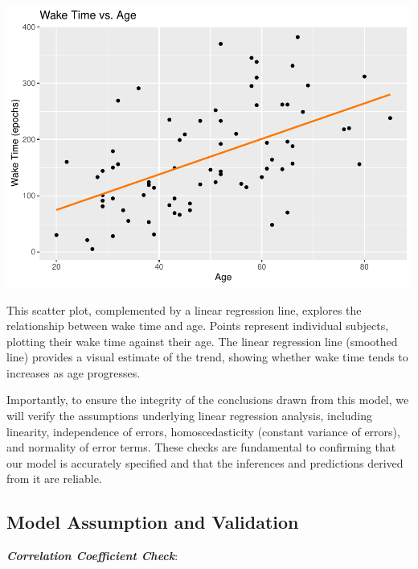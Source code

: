 \documentclass[
]{article}
\newenvironment{Shaded}{\begin{snugshade}}{\end{snugshade}}
\newcommand{\FunctionTok}[1]{\textcolor[rgb]{0.13,0.29,0.53}{\textbf{#1}}}
\newcommand{\NormalTok}[1]{#1}
\newcommand{\SpecialCharTok}[1]{\textcolor[rgb]{0.81,0.36,0.00}{\textbf{#1}}}
\begin{document}
\includegraphics{602_project_files/figure-latex/unnamed-chunk-19-1.pdf}

This scatter plot, complemented by a linear regression line, explores
the relationship between wake time and age. Points represent individual
subjects, plotting their wake time against their age. The linear
regression line (smoothed line) provides a visual estimate of the trend,
showing whether wake time tends to increases as age progresses.

Importantly, to ensure the integrity of the conclusions drawn from this
model, we will verify the assumptions underlying linear regression
analysis, including linearity, independence of errors, homoscedasticity
(constant variance of errors), and normality of error terms. These
checks are fundamental to confirming that our model is accurately
specified and that the inferences and predictions derived from it are
reliable.

\hypertarget{model-assumption-and-validation-1}{%
\subsection{Model Assumption and
Validation}\label{model-assumption-and-validation-1}}

\textbf{\emph{Correlation Coefficient Check}}:

\begin{Shaded}
\end{Shaded}
\end{document}
